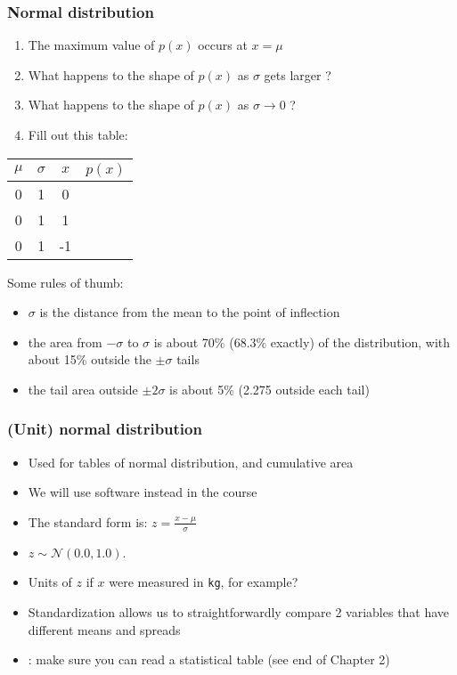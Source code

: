 \begin{frame}\frametitle{Normal distribution}
	\begin{enumerate}
		\item	The maximum value of $p(x)$ occurs at $x = \mu$
		\item	What happens to the shape of $p(x)$ as $\sigma$ gets larger ?
		\item	What happens to the shape of $p(x)$ as $\sigma \rightarrow 0$ ?
		\item	Fill out this table:
	\end{enumerate}
	\begin{center}
		\begin{tabular}{|c|c|c|c|}\hline
			$\mu$		&	$\sigma$ 	&	$x$		&	$p(x)$\\ \hline
			0 			&  	1			& 	0 		&		  \\ \hline
			0 			&	1			& 	1		&  		  \\ \hline
			0 			&	1			& 	-1		&  		  \\ \hline
		\end{tabular}
		
	\end{center}
	Some rules of thumb:
	\begin{itemize}
		\item	$\sigma$ is the distance from the mean to the point of inflection
		\item	the area from $-\sigma$ to $\sigma$ is about 70\% (68.3\% exactly) of the distribution, with about 15\% outside the $\pm \sigma$ tails
		\item	the tail area outside $\pm 2\sigma$ is about 5\% (2.275 outside each tail)
	\end{itemize}
\end{frame}

\begin{frame}\frametitle{(Unit) normal distribution}
	\begin{itemize}
		\item	Used for tables of normal distribution, and cumulative area
		\item	We will use software instead in the course
		\item	The standard form is: $ z = \displaystyle \frac{x - \mu}{\sigma} $
		\item	$z \sim \mathcal{N}(0.0, 1.0)$.
		\item	Units of $z$ if $x$ were measured in \texttt{kg}, for example? 
		\item	Standardization allows us to straightforwardly compare 2 variables that have different means and spreads
		\item	{\color{red}{Recommendation}}: make sure you can read a statistical table (see end of Chapter 2)
	\end{itemize}
\end{frame}

